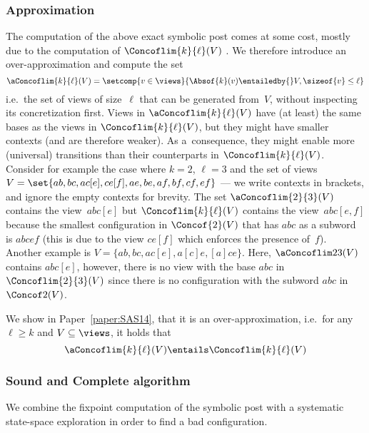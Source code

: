 \subsubsection{Approximation}
%
The computation of the above exact symbolic post comes at some cost,
mostly due to the computation of $\Concoflim{k}{\ell}(V)$ .
%
We therefore introduce an over-approximation and compute the set
$$\aConcoflim{k}{\ell}(V)=\setcomp{v\in\views}{\Absof{k}(v)\entailedby{}V,\sizeof{v}\leq\ell}$$
i.e.\ the set of views of size~$\ell$ that can be generated from~$V$,
without inspecting its concretization first.
%
Views in $\aConcoflim{k}{\ell}(V)$ have (at least) the same bases as
the views in $\Concoflim{k}{\ell}(V)$, but they might have smaller
contexts (and are therefore weaker). As a~consequence, they might
enable more (universal) transitions than their counterparts in
$\Concoflim{k}{\ell}(V)$.
%
Consider for example the case where $k=2$, $\ell=3$ and the set of
views $V = \set{ab, bc, ac[e], ce[f], ae, be, af, bf, cf, ef}$ --- we
write contexts in brackets, and ignore the empty contexts for brevity.
%
The set $\aConcoflim{2}{3}(V)$ contains the view~$abc[e]$ but
$\Concoflim{k}{\ell}(V)$ contains the view~$abc[e,f]$ because the
smallest configuration in $\Concof{2}(V)$ that has $abc$ as a subword
is $abcef$ (this is due to the view $ce[f]$ which enforces the
presence of~$f$).
%
Another example is $V = \{ab,bc,ac[e],a[c]e,[a]ce\}$.
%
Here, $\aConcoflim 2 3 (V)$ contains $abc[e]$, however, there is
no view with the base $abc$ in $\Concoflim{2}{3}(V)$ since there
is no configuration with the subword $abc$ in $\Concof 2 (V)$.

We show in Paper~\ref{paper:SAS14}, that it is an
over-approximation, i.e.\ for any $\ell\geq k$ and $V\subseteq\views$,
it holds that %
$$\aConcoflim{k}{\ell}(V)\entails \Concoflim{k}{\ell}(V)$$

\subsubsection{Sound and Complete algorithm}
%
We combine the fixpoint computation of the symbolic post with a
systematic state-space exploration in order to find a %
bad configuration.


